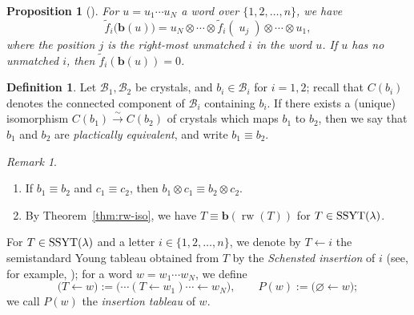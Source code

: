 \documentclass[reqno]{amsart}
\newtheorem{proposition}[theorem]{Proposition}
\theoremstyle{definition}
\newtheorem{definition}[theorem]{Definition}
\theoremstyle{remark}
\newtheorem{remark}[theorem]{Remark}
\numberwithin{equation}{section}
\newcommand{\B}{\mathcal{B}}
\newcommand{\tf}{\tilde f}
\newcommand{\rw}{\operatorname{rw}}
\begin{document}
	\begin{proposition}[{\cite{bumpschilling}}]\label{prop:signature-rule}
		For $u=u_1\cdots u_N$ a word over $\{1,2,\dots,n\}$, we have
		$$\tf_i\bigl(\mathbf{b}(u)\bigr)=\boxed{u_N}\otimes\cdots\otimes \tf_i(\;\boxed{u_j}\;)\otimes\cdots\otimes \boxed{u_1},$$
		where the position $j$ is the right-most unmatched $i$ in the word $u$.
		If $u$ has no unmatched $i$, then $\tf_i(\mathbf{b}(u))=0$.
	\end{proposition}
	
	\begin{definition}
		Let $\B_1,\B_2$ be crystals, and $b_i\in\B_i$ for $i=1,2$;
		recall that $C(b_i)$ denotes the connected component of $\B_i$ containing $b_i$.
		If there exists a (unique) isomorphism  $C(b_1)\xrightarrow{\ \sim\ }C(b_2)$ of crystals which maps $b_1$ to $b_2$,
		then we say that $b_1$ and $b_2$ are \emph{plactically equivalent},
		and write $b_1\equiv b_2$.
	\end{definition}
	\begin{remark}\label{rem:T-equiv-boxT}
		\begin{enumerate}
			\item[(i)] If $b_1\equiv b_2$ and $c_1\equiv c_2$,
			then $b_1\otimes c_1\equiv b_2\otimes c_2$.
			\item[(ii)] 
			By Theorem~\ref{thm:rw-iso}, 
			we have $T\equiv \mathbf{b}(\rw(T))$
			for $T\in\operatorname{SSYT}(\lambda)$.
		\end{enumerate}
	\end{remark}
	
	For $T\in\operatorname{SSYT}(\lambda)$ and a letter $i\in\{1,2,\dots,n\}$,
	we denote by $T\leftarrow i$
	the semistandard Young tableau obtained from $T$ by the \emph{Schensted insertion} of
	$i$ (see, for example, \cite[\S 7]{bumpschilling});
	for a word $w=w_1\cdots w_N$, we define
	\[
	\bigl(T\leftarrow w\bigr):=\bigl(\cdots(T\leftarrow w_1)\cdots\leftarrow w_N\bigr),
	\qquad
	P(w):=\bigl(\varnothing\leftarrow w\bigr);
	\]
	we call $P(w)$ the \emph{insertion tableau} of $w$.
	
\end{document}

